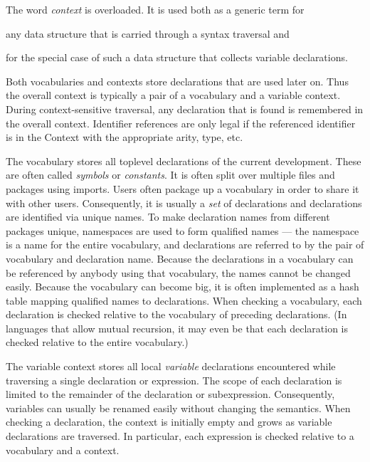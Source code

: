 \begin{terminology}
The word \emph{context} is overloaded.
It is used both as a generic term for
\begin{compactitem}
\item any data structure that is carried through a syntax traversal and
\item for the special case of such a data structure that collects variable declarations.
\end{compactitem}
\end{terminology}

Both vocabularies and contexts store declarations that are used later on.
Thus the overall context is typically a pair of a vocabulary and a variable context.
During context-sensitive traversal, any declaration that is found is remembered in the overall context.
Identifier references are only legal if the referenced identifier is in the Context with the appropriate arity, type, etc.

The vocabulary stores all toplevel declarations of the current development.
These are often called \emph{symbols} or \emph{constants}.
It is often split over multiple files and packages using imports.
Users often package up a vocabulary in order to share it with other users.
Consequently, it is usually a \emph{set} of declarations and declarations are identified via unique names.
To make declaration names from different packages unique, namespaces are used to form qualified names --- the namespace is a name for the entire vocabulary, and declarations are referred to by the pair of vocabulary and declaration name.
Because the declarations in a vocabulary can be referenced by anybody using that vocabulary, the names cannot be changed easily.
Because the vocabulary can become big, it is often implemented as a hash table mapping qualified names to declarations.
When checking a vocabulary, each declaration is checked relative to the vocabulary of preceding declarations. (In languages that allow mutual recursion, it may even be that each declaration is checked relative to the entire vocabulary.)

The variable context stores all local \emph{variable} declarations encountered while traversing a single declaration or expression.
The scope of each declaration is limited to the remainder of the declaration or subexpression.
Consequently, variables can usually be renamed easily without changing the semantics.
When checking a declaration, the context is initially empty and grows as variable declarations are traversed.
In particular, each expression is checked relative to a vocabulary and a context.

